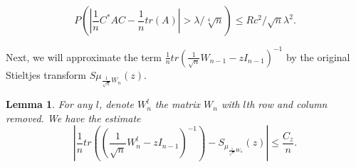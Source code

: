 \documentclass[12pt,a4paper,leqno]{report}
\theoremstyle{plain}
\newtheorem{lem}[equation]{Lemma}
\theoremstyle{definition}
\theoremstyle{remark}
\begin{document}
\begin{equation*}
P(|\frac{1}{n}C^* A C - \frac{1}{n}tr(A)|>\lambda / \sqrt[4]{n}) \leq Rc^2/\sqrt{n}\lambda^2 .
\end{equation*}

Next, we will approximate the term $\frac{1}{n}tr(\frac{1}{\sqrt{n}}W_{n-1}-zI_{n-1})^{-1}$ by the original Stieltjes transform $S\mu_{\frac{1}{\sqrt{n}}W_n}(z)$.

\begin{lem} \label{est5}
For any $l$, denote $W_n^l$ the matrix $W_n$ with $l$th row and column removed. We have the estimate
\begin{equation*}
|\frac{1}{n}tr((\frac{1}{\sqrt{n}}W_n^l-zI_{n-1})^{-1}) - S_{\mu_{\frac{1}{\sqrt{n}}W_n}}(z)| \leq \frac{C_z}{n}.
\end{equation*}
\end{lem}
\end{document}

